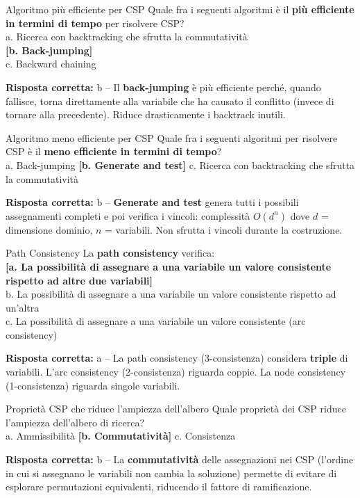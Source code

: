 \documentclass[12pt,a4paper]{article}
\newcommand{\corr}[1]{\textcolor{green!55!black}{\textbf{[#1]}}}
\newcommand{\risp}[1]{\begin{abox}\textbf{Risposta corretta: }#1\end{abox}}
\begin{document}
\bigskip
\begin{qbox}{Algoritmo più efficiente per CSP}
Quale fra i seguenti algoritmi è il \textbf{più efficiente in termini di tempo} per risolvere CSP?\\[4pt]
a. Ricerca con backtracking che sfrutta la commutatività\\
\corr{b. Back-jumping}\\
c. Backward chaining
\end{qbox}
\risp{b -- Il \textbf{back-jumping} è più efficiente perché, quando fallisce, torna direttamente alla variabile che ha causato il conflitto (invece di tornare alla precedente). Riduce drasticamente i backtrack inutili.}

\bigskip
\begin{qbox}{Algoritmo meno efficiente per CSP}
Quale fra i seguenti algoritmi per risolvere CSP è il \textbf{meno efficiente in termini di tempo}?\\[4pt]
a. Back-jumping \quad
\corr{b. Generate and test} \quad
c. Ricerca con backtracking che sfrutta la commutatività
\end{qbox}
\risp{b -- \textbf{Generate and test} genera tutti i possibili assegnamenti completi e poi verifica i vincoli: complessità $O(d^n)$ dove $d$ = dimensione dominio, $n$ = variabili. Non sfrutta i vincoli durante la costruzione.}

\bigskip
\begin{qbox}{Path Consistency}
La \textbf{path consistency} verifica:
\\[4pt]
\corr{a. La possibilità di assegnare a una variabile un valore consistente rispetto ad altre \textbf{due} variabili}\\
b. La possibilità di assegnare a una variabile un valore consistente rispetto ad un'altra\\
c. La possibilità di assegnare a una variabile un valore consistente (arc consistency)
\end{qbox}
\risp{a -- La path consistency (3-consistenza) considera \textbf{triple} di variabili. L'arc consistency (2-consistenza) riguarda coppie. La node consistency (1-consistenza) riguarda singole variabili.}

\bigskip
\begin{qbox}{Proprietà CSP che riduce l'ampiezza dell'albero}
Quale proprietà dei CSP riduce l'ampiezza dell'albero di ricerca?\\[4pt]
a. Ammissibilità \quad \corr{b. Commutatività} \quad c. Consistenza
\end{qbox}
\risp{b -- La \textbf{commutatività} delle assegnazioni nei CSP (l'ordine in cui si assegnano le variabili non cambia la soluzione) permette di evitare di esplorare permutazioni equivalenti, riducendo il fattore di ramificazione.}
\end{document}
